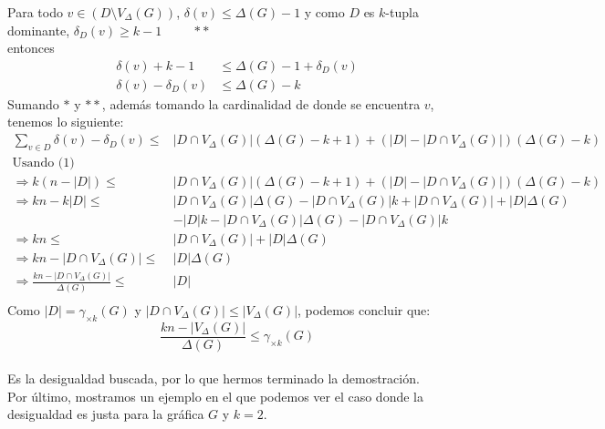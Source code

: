 \documentclass{article}
\begin{document}
Para todo $v\in (D\setminus V_\Delta(G))$, $\delta(v)\leq \Delta(G)-1$ y como $D$ es $k$-tupla dominante, $\delta_D(v)\geq k-1 \hspace{1cm} **$\\
 entonces\\

\begin{align*}
\delta(v)+k-1 &\leq \Delta(G)-1+\delta_D(v)\\
\delta(v)-\delta_D(v) &\leq \Delta(G)-k
\end{align*}
Sumando $*$ y $**$, además tomando la cardinalidad de donde se encuentra $v$, tenemos lo siguiente:\\
\begin{align*}
\sum_{v\in D}\delta(v)-\delta_D(v) \leq& |D\cap V_\Delta(G)|(\Delta(G)-k+1) + (|D|-|D\cap V_\Delta(G)|)(\Delta(G)-k)\\
\text{Usando (1)}\\
\Longrightarrow k(n-|D|) \leq& |D\cap V_\Delta(G)|(\Delta(G)-k+1) + (|D|-|D\cap V_\Delta(G)|)(\Delta(G)-k)\\
\Longrightarrow kn - k|D| \leq& |D\cap V_\Delta(G)|\Delta(G) - |D\cap V_\Delta(G)|k + |D\cap V_\Delta(G)| + |D|\Delta(G)\\
& - |D|k - |D\cap V_\Delta(G)|\Delta(G) - |D\cap V_\Delta(G)|k\\
\Longrightarrow kn \leq& |D\cap V_\Delta(G)| + |D|\Delta(G)\\
\Longrightarrow kn - |D\cap V_\Delta(G)| \leq& |D|\Delta(G)\\
\Longrightarrow \frac{kn - |D\cap V_\Delta(G)|}{\Delta(G)} \leq& |D|\\
\end{align*}
Como $|D|=\gamma_{\times k}(G)$ y $|D\cap V_\Delta(G)|\leq |V_\Delta(G)|$, podemos concluir que:\\
$$\frac{kn - |V_\Delta(G)|}{\Delta(G)} \leq \gamma_{\times k}(G)$$\\

Es la desigualdad buscada, por lo que hermos terminado la demostración.\\

Por último, mostramos un ejemplo en el que podemos ver el caso donde la desigualdad es justa para la gráfica $G$ y $k=2$.\\
\end{document}
